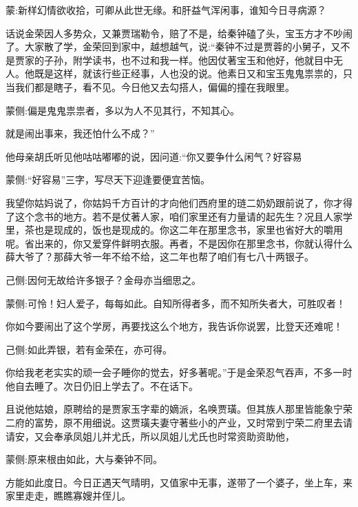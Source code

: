 

\begin{parag}
    \begin{note}蒙:新样幻情欲收拾，可卿从此世无缘。和肝益气浑闲事，谁知今日寻病源？\end{note}
\end{parag}


\begin{parag}
    话说金荣因人多势众，又兼贾瑞勒令，赔了不是，给秦钟磕了头，宝玉方才不吵闹了。大家散了学，金荣回到家中，越想越气，说:“秦钟不过是贾蓉的小舅子，又不是贾家的子孙，附学读书，也不过和我一样。他因仗著宝玉和他好，他就目中无人。他既是这样，就该行些正经事，人也没的说。他素日又和宝玉鬼鬼祟祟的，只当我们都是瞎子，看不见。今日他又去勾搭人，偏偏的撞在我眼里。\begin{note}蒙侧:偏是鬼鬼祟祟者，多以为人不见其行，不知其心。\end{note}就是闹出事来，我还怕什么不成？”
\end{parag}


\begin{parag}
    他母亲胡氏听见他咕咕嘟嘟的说，因问道:“你又要争什么闲气？好容易\begin{note}蒙侧:“好容易”三字，写尽天下迎逢要便宜苦恼。\end{note}我望你姑妈说了，你姑妈千方百计的才向他们西府里的琏二奶奶跟前说了，你才得了这个念书的地方。若不是仗著人家，咱们家里还有力量请的起先生？况且人家学里，茶也是现成的，饭也是现成的。你这二年在那里念书，家里也省好大的嚼用呢。省出来的，你又爱穿件鲜明衣服。再者，不是因你在那里念书，你就认得什么薛大爷了？那薛大爷一年不给不给，这二年也帮了咱们有七八十两银子。\begin{note}己侧:因何无故给许多银子？金母亦当细思之。\end{note}\begin{note}蒙侧:可怜！妇人爱子，每每如此。自知所得者多，而不知所失者大，可胜叹者！\end{note}你如今要闹出了这个学房，再要找这么个地方，我告诉你说罢，比登天还难呢！\begin{note}己侧:如此弄银，若有金荣在，亦可得。\end{note}你给我老老实实的顽一会子睡你的觉去，好多著呢。”于是金荣忍气吞声，不多一时他自去睡了。次日仍旧上学去了。不在话下。
\end{parag}


\begin{parag}
    且说他姑娘，原聘给的是贾家玉字辈的嫡派，名唤贾璜。但其族人那里皆能象宁荣二府的富势，原不用细说。这贾璜夫妻守著些小的产业，又时常到宁荣二府里去请请安，又会奉承凤姐儿并尤氏，所以凤姐儿尤氏也时常资助资助他，\begin{note}蒙侧:原来根由如此，大与秦钟不同。\end{note}方能如此度日。今日正遇天气晴明，又值家中无事，遂带了一个婆子，坐上车，来家里走走，瞧瞧寡嫂并侄儿。
\end{parag}



